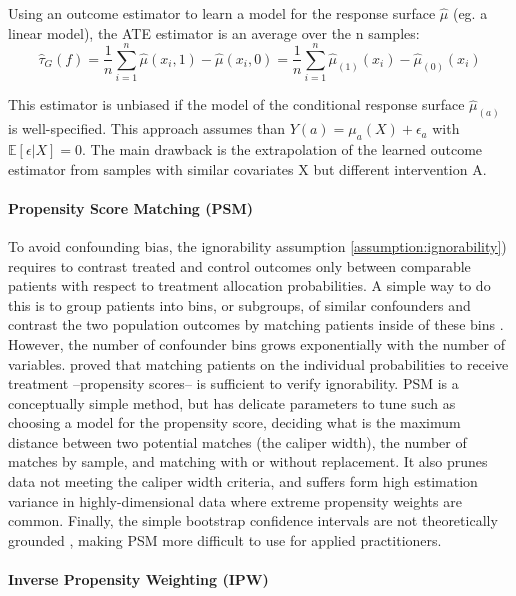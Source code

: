 \documentclass[french,12pt,twoside,a4paper]{book}
\begin{document}
\begin{appendices}
\begin{background_box_left}
    Using an outcome estimator to learn a model for the response surface $\hat
      \mu$ (eg. a linear model), the ATE estimator is an average over the n samples:
    \begin{equation}
      \hat{\tau}_G(f) = \frac{1}{n} \sum_{i=1}^n \hat \mu(x_i, 1) - \hat \mu(x_i, 0) = \frac{1}{n} \sum_{i=1}^n \hat \mu_{(1)}(x_i) - \hat \mu_{(0)}(x_i)
    \end{equation}

    This estimator is unbiased if the model of the conditional response surface
    $\hat \mu_{(a)}$ is well-specified. This approach assumes than $Y(a) =
      \mu_a(X) + \epsilon_a$ with $\mathbb E[\epsilon|X] = 0$. The main drawback is
    the extrapolation of the learned outcome estimator from samples with similar
    covariates X but different intervention A.

    \paragraph{Propensity Score Matching (PSM)} To avoid confounding bias, the
    ignorability assumption \ref{assumption:ignorability}) requires to contrast
    treated and control outcomes only between comparable patients with respect to
    treatment allocation probabilities. A simple way to do this is to group
    patients into bins, or subgroups, of similar confounders and contrast the two
    population outcomes by matching patients inside of these bins
    \citep{stuart2010matching}. However, the number of confounder bins grows
    exponentially with the number of variables. \cite{rosenbaum1983central} proved
    that matching patients on the individual probabilities to receive treatment
    --propensity scores-- is sufficient to verify ignorability. PSM is a
    conceptually simple method, but has delicate parameters to tune such as
    choosing a model for the propensity score, deciding what is the maximum
    distance between two potential matches (the caliper width), the number of
    matches by sample, and matching with or without replacement. It also prunes data
    not meeting the caliper width criteria, and suffers form high estimation
    variance in highly-dimensional data where extreme propensity weights are common.
    Finally, the simple bootstrap confidence intervals are not theoretically
    grounded \citep{abadie2008failure}, making PSM more difficult
    to use for applied practitioners.


    \paragraph{Inverse Propensity Weighting (IPW)}


\end{background_box_left}
\end{appendices}
\end{document}
